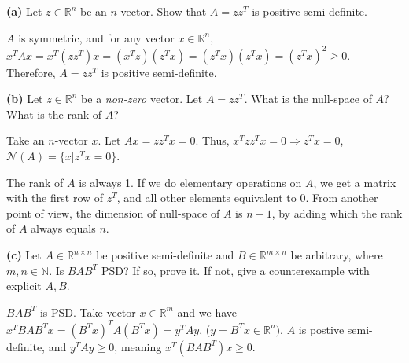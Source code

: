 \documentclass[11pt]{article}
\renewcommand\part[1]{\vspace{.10in}\textbf{(#1)  }}
\begin{document}
\part{a}Let $z \in \mathbb{R}^n$ be an $n$-vector. Show that $A=zz^T$ is positive semi-definite.

$A$ is symmetric, and for any vector $x\in \mathbb{R}^n$, $x^TAx = x^T(zz^T)x = (x^Tz)(z^Tx)=(z^Tx)(z^Tx)=(z^Tx)^2 \geq 0$. Therefore, $A=zz^T$ is positive semi-definite.

\part{b}Let $z \in \mathbb{R}^n$ be a \emph{non-zero} vector. Let $A=zz^T$. What is the null-space of $A$? What is the rank of $A$?

Take an $n$-vector $x$. Let $Ax = zz^Tx = 0$. Thus, $x^Tzz^Tx = 0 \Rightarrow z^Tx = 0$, $\mathcal{N}(A) = \{x|z^Tx = 0\}$.

The rank of $A$ is always 1. If we do elementary operations on $A$, we get a matrix with the first row of $z^T$, and all other elements equivalent to 0. From another point of view, the dimension of null-space of $A$ is $n-1$, by adding which the rank of $A$ always equals $n$.

\part{c}Let $A \in \mathbb{R}^{n\times n}$ be positive semi-definite and $B \in \mathbb{R}^{m \times n}$ be arbitrary, where $m, n \in \mathbb{N}$. Is $BAB^T$ PSD? If so, prove it. If not, give a counterexample with explicit $A, B$.

$BAB^T$ is PSD. Take vector $x\in \mathbb{R}^m$ and we have $x^TBAB^Tx = (B^Tx)^TA(B^Tx) = y^TAy$, ($y = B^Tx \in \mathbb{R}^n)$. $A$ is postive semi-definite, and $y^TAy \geq 0$, meaning $x^T(BAB^T)x \geq 0$.
\end{document}
